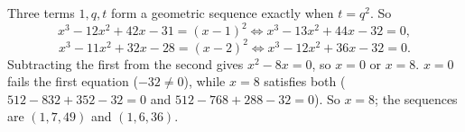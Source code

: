 Three terms $1,q,t$ form a geometric sequence exactly when $t=q^2$. So
\[
x^3-12x^2+42x-31=(x-1)^2\iff x^3-13x^2+44x-32=0,
\]
\[
x^3-11x^2+32x-28=(x-2)^2\iff x^3-12x^2+36x-32=0 .
\]
Subtracting the first from the second gives $x^2-8x=0$, so $x=0$ or $x=8$. $x=0$ fails the first equation ($-32\ne0$), while $x=8$ satisfies both ($512-832+352-32=0$ and $512-768+288-32=0$). So $x=\boxed{8}$; the sequences are $(1,7,49)$ and $(1,6,36)$.
